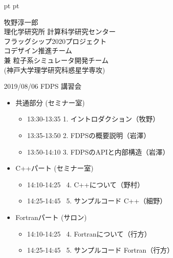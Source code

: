 \documentclass[12pt,dvipdfmx]{article}
\begin{document}
\LARGE

 pt
 pt

\date{}





{\large

\begin{center}
牧野淳一郎\\
理化学研究所 計算科学研究センター\\
フラッグシップ2020プロジェクト\\
コデザイン推進チーム\\
兼 粒子系シミュレータ開発チーム\\
(神戸大学理学研究科惑星学専攻)
\leavevmode


\end{center}

}

\vfill

\hfill 2019/08/06  FDPS 講習会
 



\begin{itemize}

\item 共通部分  (セミナー室)
\begin{itemize}
\item 13:30-13:35 1. イントロダクション（牧野）
\item 13:35-13:50 2. FDPSの概要説明（岩澤）
\item 13:50-14:10 3. FDPSのAPIと内部構造（岩澤）
\end{itemize}

\item  C++パート (セミナー室)
\begin{itemize}
\item 14:10-14:25  4. C++について（野村）
\item 14:25-14:45  5. サンプルコード C++（細野）
\end{itemize}

\item  Fortranパート (サロン)
\begin{itemize}
\item 14:10-14:25  4. Fortranについて（行方）
\item 14:25-14:45  5. サンプルコード Fortran（行方）
\end{itemize}
\end{itemize}
\end{document}
